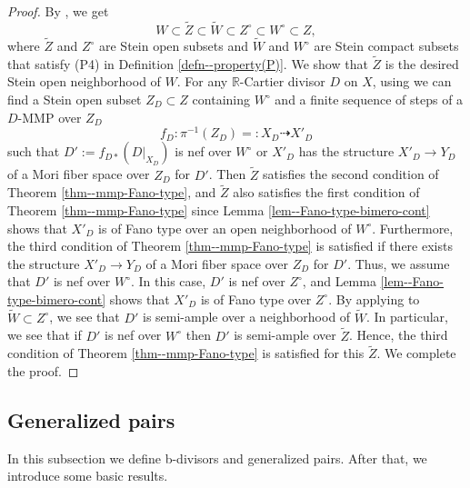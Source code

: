 \documentclass[12pt]{amsart}
\theoremstyle{definition}
\begin{document}
\begin{proof}
By \cite[Lemma 2.16]{fujino-analytic-bchm}, we get
$$W \subset \tilde{Z} \subset \tilde{W} \subset Z^{\circ} \subset W^{\circ} \subset  Z,$$
where $\tilde{Z}$ and $Z^{\circ}$ are Stein open subsets and $\tilde{W}$ and $W^{\circ}$ are Stein compact subsets that satisfy (P4) in Definition \ref{defn--property(P)}. 
We show that $\tilde{Z}$ is the desired Stein open neighborhood of $W$. 
For any $\mathbb{R}$-Cartier divisor $D$ on $X$, using \cite{fujino-analytic-bchm} we can find a Stein open subset $Z_{D} \subset Z$ containing $W^{\circ}$ and a finite sequence of steps of a $D$-MMP over $Z_{D}$
$$f_{D}\colon \pi^{-1}(Z_{D})=:X_{D} \dashrightarrow X'_{D}$$
such that $D':=f_{D*}(D|_{X_{D}})$ is nef over $W^{\circ}$ or $X'_{D}$ has the structure $X'_{D} \to Y_{D}$ of a Mori fiber space over $Z_{D}$ for $D'$. 
Then $\tilde{Z}$ satisfies the second condition of Theorem \ref{thm--mmp-Fano-type}, and $\tilde{Z}$ also satisfies the first condition of Theorem \ref{thm--mmp-Fano-type} since Lemma \ref{lem--Fano-type-bimero-cont} shows that $X'_{D}$ is of Fano type over an open neighborhood of $W^{\circ}$. 
Furthermore, the third condition of Theorem \ref{thm--mmp-Fano-type} is satisfied if there exists the structure $X'_{D} \to Y_{D}$ of a Mori fiber space over $Z_{D}$ for $D'$. 
Thus, we assume that $D'$ is nef over $W^{\circ}$. 
In this case, $D'$ is nef over $Z^{\circ}$, and Lemma \ref{lem--Fano-type-bimero-cont} shows that $X'_{D}$ is of Fano type over $Z^{\circ}$. 
By applying \cite[Theorem 8.1]{fujino-analytic-bchm} to $\tilde{W} \subset Z^{\circ}$, we see that $D'$ is semi-ample over a neighborhood of $\tilde{W}$. 
In particular, we see that if $D'$ is nef over $W^{\circ}$ then $D'$ is semi-ample over $\tilde{Z}$. 
Hence, the third condition of Theorem \ref{thm--mmp-Fano-type} is satisfied for this $\tilde{Z}$. 
We complete the proof. 
\end{proof}


\subsection{Generalized pairs}

In this subsection we define b-divisors and generalized pairs. 
After that, we introduce some basic results.  
\end{document}
